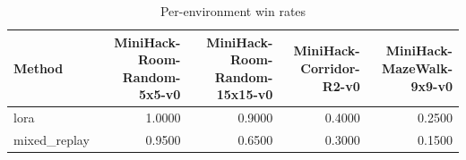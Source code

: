 \begin{table}[htbp]
\centering
\caption{Per-environment win rates}
\label{tab:per-env}
\begin{tabular}{lrrrr}
\toprule
\textbf{Method} & \textbf{MiniHack-Room-Random-5x5-v0} & \textbf{MiniHack-Room-Random-15x15-v0} & \textbf{MiniHack-Corridor-R2-v0} & \textbf{MiniHack-MazeWalk-9x9-v0} \\
\midrule
lora & 1.0000 & 0.9000 & 0.4000 & 0.2500 \\
mixed\_replay & 0.9500 & 0.6500 & 0.3000 & 0.1500 \\
\bottomrule
\end{tabular}
\end{table}